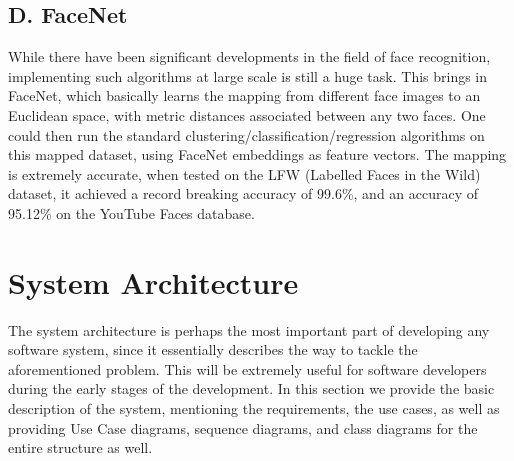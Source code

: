 \documentclass[conference]{IEEEtran}
\begin{document}
\subsection*{D. FaceNet}
While there have been significant developments in the field of face recognition, implementing such algorithms at large scale is still a huge task. This brings in FaceNet, which basically learns the mapping from different face images to an Euclidean space, with metric distances associated between any two faces.
One could then run the standard clustering/classification/regression algorithms on this mapped dataset, using FaceNet embeddings as feature vectors. The mapping is extremely accurate, when tested on the LFW (Labelled Faces in the Wild) dataset, it achieved a record breaking accuracy of 99.6\%, and an accuracy of 95.12\% on the YouTube Faces database.
\section{System Architecture}
The system architecture is perhaps the most important part of developing any software system, since 
it essentially describes the way to tackle the aforementioned problem. This will be extremely useful for software developers during the early stages of the development. In this section
we provide the basic description of the system, mentioning the requirements, the use cases, as well as providing Use Case diagrams, sequence diagrams, and class diagrams for the entire structure as well.
\end{document}
